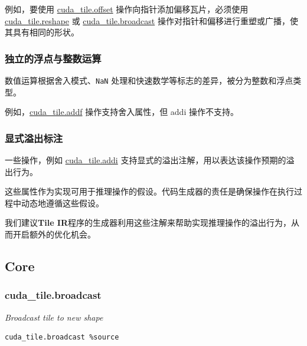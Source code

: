\documentclass{article}
\begin{document}
例如，要使用 \href{https://docs.nvidia.com/cuda/tile-ir/latest/sections/operations.html#op-cuda-tile-offset}{cuda\_tile.offset} 操作向指针添加偏移瓦片，必须使用 \href{https://docs.nvidia.com/cuda/tile-ir/latest/sections/operations.html#op-cuda-tile-reshape}{cuda\_tile.reshape} 或 \href{https://docs.nvidia.com/cuda/tile-ir/latest/sections/operations.html#op-cuda-tile-broadcast}{cuda\_tile.broadcast} 操作对指针和偏移进行重塑或广播，使其具有相同的形状。



\subsubsection{独立的浮点与整数运算}

数值运算根据舍入模式、\texttt{NaN} 处理和快速数学等标志的差异，被分为整数和浮点类型。


例如，\href{https://docs.nvidia.com/cuda/tile-ir/latest/sections/operations.html#op-cuda-tile-addf}{cuda\_tile.addf} 操作支持舍入属性，但 addi 操作不支持。



\subsubsection{显式溢出标注}

一些操作，例如 \href{https://docs.nvidia.com/cuda/tile-ir/latest/sections/operations.html#op-cuda-tile-addi}{cuda\_tile.addi} 支持显式的溢出注解，用以表达该操作预期的溢出行为。


这些属性作为实现可用于推理操作的假设。代码生成器的责任是确保操作在执行过程中动态地遵循这些假设。


我们建议\textbf{Tile IR}程序的生成器利用这些注解来帮助实现推理操作的溢出行为，从而开启额外的优化机会。



\subsection{Core}

\subsubsection{cuda\_tile.broadcast}

\textit{Broadcast tile to new shape}


\begin{lstlisting}
cuda_tile.broadcast %source
\end{lstlisting}
\end{document}
